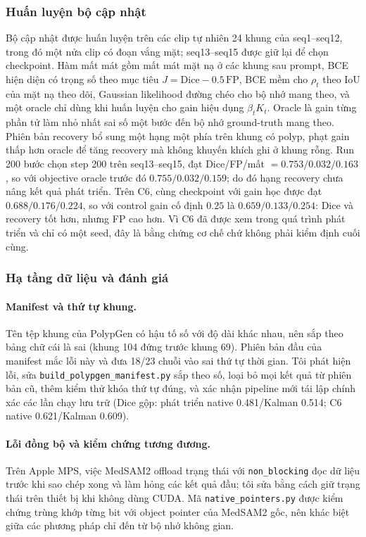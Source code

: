 \documentclass[a4paper,12pt]{report}
\begin{document}
\subsubsection{Huấn luyện bộ cập nhật}

Bộ cập nhật được huấn luyện trên các clip tự nhiên 24 khung của seq1--seq12, trong đó một nửa clip có đoạn vắng mặt; seq13--seq15 được giữ lại để chọn checkpoint. Hàm mất mát gồm mất mát mặt nạ ở các khung sau prompt, BCE hiện diện có trọng số theo mục tiêu $J=\mathrm{Dice}-0.5\,\mathrm{FP}$, BCE mềm cho $\rho_t$ theo IoU của mặt nạ theo dõi, Gaussian likelihood đường chéo cho bộ nhớ mang theo, và một oracle chỉ dùng khi huấn luyện cho gain hiệu dụng $\beta_tK_t$. Oracle là gain từng phần tử làm nhỏ nhất sai số một bước đến bộ nhớ ground-truth mang theo. Phiên bản recovery bổ sung một hạng một phía trên khung có polyp, phạt gain thấp hơn oracle để tăng recovery mà không khuyến khích ghi ở khung rỗng. Run 200 bước chọn step 200 trên seq13--seq15, đạt Dice/FP/mất $=0.753/0.032/0.163$, so với objective oracle trước đó $0.755/0.032/0.159$; do đó hạng recovery chưa nâng kết quả phát triển. Trên C6, cùng checkpoint với gain học được đạt $0.688/0.176/0.224$, so với control gain cố định $0.25$ là $0.659/0.133/0.254$: Dice và recovery tốt hơn, nhưng FP cao hơn. Vì C6 đã được xem trong quá trình phát triển và chỉ có một seed, đây là bằng chứng cơ chế chứ không phải kiểm định cuối cùng.

\subsubsection{Hạ tầng dữ liệu và đánh giá}

\paragraph{Manifest và thứ tự khung.} Tên tệp khung của PolypGen có hậu tố số với độ dài khác nhau, nên sắp theo bảng chữ cái là sai (khung 104 đứng trước khung 69). Phiên bản đầu của manifest mắc lỗi này và đưa 18/23 chuỗi vào sai thứ tự thời gian. Tôi phát hiện lỗi, sửa \texttt{build\_polypgen\_manifest.py} sắp theo số, loại bỏ mọi kết quả từ phiên bản cũ, thêm kiểm thử khóa thứ tự đúng, và xác nhận pipeline mới tái lập chính xác các lần chạy lưu trữ (Dice gộp: phát triển native 0.481/Kalman 0.514; C6 native 0.621/Kalman 0.609).

\paragraph{Lỗi đồng bộ và kiểm chứng tương đương.} Trên Apple MPS, việc MedSAM2 offload trạng thái với \texttt{non\_blocking} đọc dữ liệu trước khi sao chép xong và làm hỏng các kết quả đầu; tôi sửa bằng cách giữ trạng thái trên thiết bị khi không dùng CUDA. Mã \texttt{native\_pointers.py} được kiểm chứng trùng khớp từng bit với object pointer của MedSAM2 gốc, nên khác biệt giữa các phương pháp chỉ đến từ bộ nhớ không gian.
\end{document}
